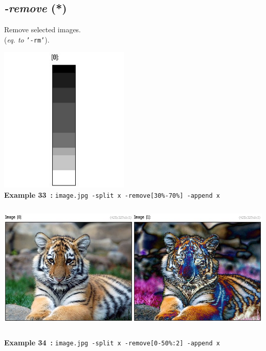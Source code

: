 \documentclass[a4paper,11pt,twoside]{book}
\begin{document}
\subsection{\emph{-remove} (*)}\vspace*{-0.5em}
Remove selected images.
~\\(\emph{eq. to} {\small \texttt{'-rm'}}).
\begin{center}\includegraphics[keepaspectratio=true,height=7cm,width=\textwidth]{img/gmic_def33.jpg}\\
{\footnotesize \textbf{Example 33~:} \texttt{image.jpg -split x -remove[30\%-70\%] -append x}}
\\\includegraphics[keepaspectratio=true,height=7cm,width=\textwidth]{img/gmic_def34.jpg}\\
{\footnotesize \textbf{Example 34~:} \texttt{image.jpg -split x -remove[0-50\%:2] -append x}}
\end{center}
\end{document}
